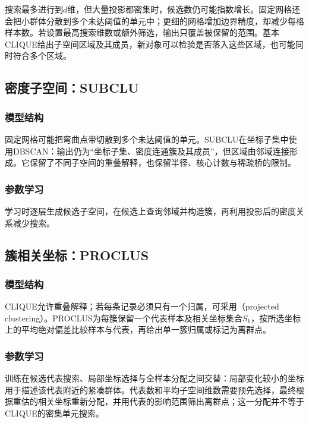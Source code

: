搜索最多进行到$d$维，但大量投影都密集时，候选数仍可能指数增长。固定网格还会把小群体分散到多个未达阈值的单元中；更细的网格增加边界精度，却减少每格样本数。若设置最高搜索维数或额外筛选，输出只覆盖被保留的范围。基本CLIQUE给出子空间区域及其成员，新对象可以检验是否落入这些区域，也可能同时符合多个区域。
\subsection{密度子空间：SUBCLU}

\subsubsection{模型结构}

固定网格可能把弯曲点带切散到多个未达阈值的单元。SUBCLU在坐标子集中使用DBSCAN：输出仍为“坐标子集、密度连通簇及其成员”，但区域由邻域连接形成。它保留了不同子空间的重叠解释，也保留半径、核心计数与稀疏桥的限制。

\subsubsection{参数学习}

学习时逐层生成候选子空间，在候选上查询邻域并构造簇，再利用投影后的密度关系减少搜索。

\subsection{簇相关坐标：PROCLUS}

\subsubsection{模型结构}

CLIQUE允许重叠解释；若每条记录必须只有一个归属，可采用（projected clustering）。PROCLUS为每簇保留一个代表样本及相关坐标集合$S_k$，按所选坐标上的平均绝对偏差比较样本与代表，再给出单一簇归属或标记为离群点。

\subsubsection{参数学习}

训练在候选代表搜索、局部坐标选择与全样本分配之间交替：局部变化较小的坐标用于描述该代表附近的紧凑群体。代表数和平均子空间维数需要预先选择，最终根据重估的相关坐标重新分配，并用代表的影响范围筛出离群点；这一分配并不等于CLIQUE的密集单元搜索。

